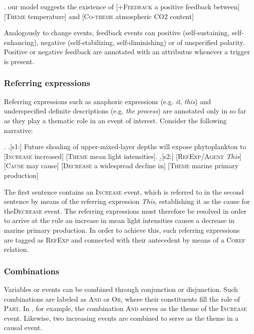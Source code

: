 \documentclass[10pt, a4paper]{article}
\newcommand{\tag}[1]{\textsc{#1}}
\begin{document}
\exi. our model suggests the existence of [\tag{+Feedback} a positive feedback between] [\tag{Theme} temperature] and [\tag{Co-theme} atmospheric CO2 content]

Analogously to change events, feedback events can positive (self-sustaining, self-enhancing), negative (self-stabilizing, self-diminishing) or of unspecified polarity.
Positive or negative feedback are annotated with an attributue whenever a trigger is present. 

\subsubsection{Referring expressions}

Referring expressions such as anaphoric expressions (e.g. \emph{it}, \emph{this}) and underspecified definite descriptions (e.g. \emph{the process}) are annotated only in so far as they play a thematic role in an event of interest. Consider the following narrative:

\exi. 
  \a.[s1:] Future shoaling of upper-mixed-layer depths will expose phytoplankton to [\tag{Increase} increased] [\tag{Theme} mean light intensities].
  \b.[s2:] [\tag{RefExp/Agent} \emph{This}] [\tag{Cause} may cause] [\tag{Decrease} a widespread decline in] [\tag{Theme} marine primary production]

The first sentence contains an \tag{Increase} event, which is referred to in the second sentence by means of the referring expression \emph{This}, establishing it as the cause for the\tag{Decrease} event.
The referring expressions must therefore be resolved in order to arrive at the rule an increase in mean light intensities causes a decrease in marine primary production.
In order to achieve this, such referring expressions are tagged as \tag{RefExp} and connected with their antecedent by means of a \tag{Coref} relation. 
  

\subsubsection{Combinations}

Variables or events can be combined through conjunction or disjunction.
Such combinations are labeled as \tag{And} or \tag{Or}, where their constituents fill the role of \tag{Part}.
In \Next[a], for example, the combination \tag{And} serves as the theme of the \tag{Increase} event.
Likewise, two increasing events are combined to serve as the theme in a causal event.
\end{document}
